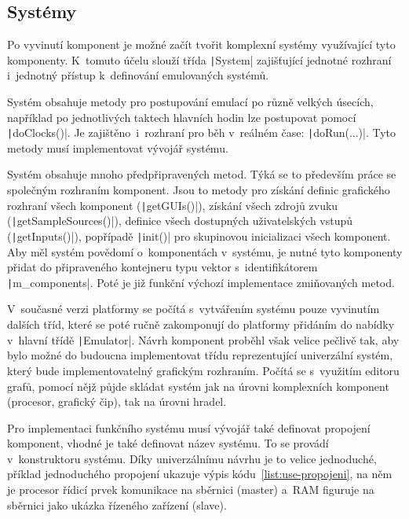 \subsection{Systémy}
Po vyvinutí komponent je možné začít tvořit komplexní systémy využívající tyto komponenty. K~tomuto účelu slouží třída \texttt|System| zajišťující jednotné rozhraní i~jednotný přístup k~definování emulovaných systémů.

Systém obsahuje metody pro postupování emulací po různě velkých úsecích, například po jednotlivých taktech hlavních hodin lze postupovat pomocí \texttt|doClocks()|. Je zajištěno~i~rozhraní pro běh v~reálném čase: \texttt|doRun(...)|. Tyto metody musí implementovat vývojář systému.

Systém obsahuje mnoho předpřipravených metod. Týká se to především práce se společným rozhraním komponent. Jsou to metody pro získání definic grafického rozhraní všech komponent (\texttt|getGUIs()|), získání všech zdrojů zvuku (\texttt|getSampleSources()|), definice všech dostupných uživatelských vstupů (\texttt|getInputs()|), popřípadě \texttt|init()| pro skupinovou inicializaci všech komponent. Aby měl systém povědomí o~komponentách v~systému, je nutné tyto komponenty přidat do připraveného kontejneru typu vektor s~identifikátorem \texttt|m_components|. Poté je již funkční výchozí implementace zmiňovaných metod.

\begin{note}
	V~současné verzi platformy se počítá s~vytvářením systému pouze vyvinutím dalších tříd, které se poté ručně zakomponují do platformy přidáním do nabídky v~hlavní třídě \texttt|Emulator|. Návrh komponent proběhl však velice pečlivě tak, aby bylo možné do budoucna implementovat třídu reprezentující univerzální systém, který bude implementovatelný grafickým rozhraním. Počítá se s~využitím editoru grafů, pomocí nějž půjde skládat systém jak na úrovni komplexních komponent (procesor, grafický čip), tak na úrovni hradel.
\end{note}

Pro implementaci funkčního systému musí vývojář také definovat propojení komponent, vhodné je také definovat název systému. To se provádí v~konstruktoru systému. Díky univerzálnímu návrhu je to velice jednoduché, příklad jednoduchého propojení ukazuje výpis kódu~\ref{list:use-propojeni}, na něm je procesor řídicí prvek komunikace na sběrnici (master) a~RAM figuruje na sběrnici jako ukázka řízeného zařízení (slave).

